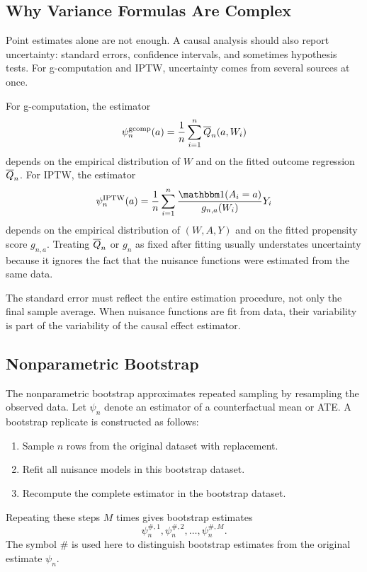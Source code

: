 \label{lec:4-7}

\subsection{Why Variance Formulas Are Complex}

Point estimates alone are not enough. A causal analysis should also report uncertainty:
standard errors, confidence intervals, and sometimes hypothesis tests. For
g-computation and IPTW, uncertainty comes from several sources at once.

For g-computation, the estimator
\[
\psi_n^{\mathrm{gcomp}}(a)
=
\frac{1}{n}\sum_{i=1}^n \overline{Q}_n(a,W_i)
\]
depends on the empirical distribution of $W$ and on the fitted outcome regression
$\overline{Q}_n$. For IPTW, the estimator
\[
\psi_n^{\IPTW}(a)
=
\frac{1}{n}\sum_{i=1}^n
\frac{\ind(A_i=a)}{g_{n,a}(W_i)}Y_i
\]
depends on the empirical distribution of $(W,A,Y)$ and on the fitted propensity score
$g_{n,a}$. Treating $\overline{Q}_n$ or $g_n$ as fixed after fitting usually understates
uncertainty because it ignores the fact that the nuisance functions were estimated
from the same data.

\begin{keyidea}
The standard error must reflect the entire estimation procedure, not only the final
sample average. When nuisance functions are fit from data, their variability is part
of the variability of the causal effect estimator.
\end{keyidea}

\subsection{Nonparametric Bootstrap}

The nonparametric bootstrap approximates repeated sampling by resampling the observed
data. Let $\psi_n$ denote an estimator of a counterfactual mean or ATE. A bootstrap
replicate is constructed as follows:

\begin{enumerate}
\item Sample $n$ rows from the original dataset with replacement.
\item Refit all nuisance models in this bootstrap dataset.
\item Recompute the complete estimator in the bootstrap dataset.
\end{enumerate}

Repeating these steps $M$ times gives bootstrap estimates
\[
\psi_n^{\#,1},\psi_n^{\#,2},\ldots,\psi_n^{\#,M}.
\]
The symbol $\#$ is used here to distinguish bootstrap estimates from the original
estimate $\psi_n$.

